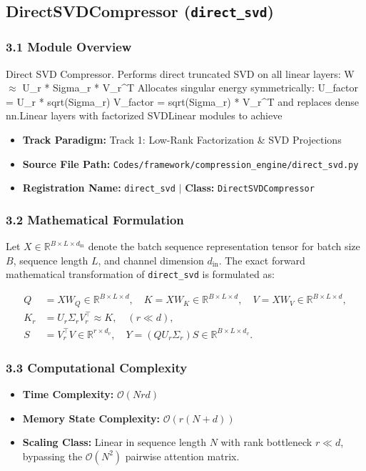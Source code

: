 \subsection{DirectSVDCompressor (\texttt{direct\_svd})}
\label{sec:app_module_direct_svd}

\subsubsection*{3.1 Module Overview}
Direct SVD Compressor.  Performs direct truncated SVD on all linear layers:     W $\approx$ U\_r * Sigma\_r * V\_r^T Allocates singular energy symmetrically:     U\_factor = U\_r * sqrt(Sigma\_r)     V\_factor = sqrt(Sigma\_r) * V\_r^T and replaces dense nn.Linear layers with factorized SVDLinear modules to achieve
\begin{itemize}
    \item \textbf{Track Paradigm:} Track 1: Low-Rank Factorization & SVD Projections
    \item \textbf{Source File Path:} \texttt{Codes/framework/compression\_engine/direct\_svd.py}
    \item \textbf{Registration Name:} \texttt{direct\_svd} $\mid$ \textbf{Class:} \texttt{DirectSVDCompressor}
\end{itemize}

\subsubsection*{3.2 Mathematical Formulation}
Let $X \in \mathbb{R}^{B \times L \times d_{\text{in}}}$ denote the batch sequence representation tensor for batch size $B$, sequence length $L$, and channel dimension $d_{\text{in}}$. The exact forward mathematical transformation of \texttt{direct\_svd} is formulated as:

\begin{align}
Q &= X W_Q \in \mathbb{R}^{B \times L \times d}, \quad K = X W_K \in \mathbb{R}^{B \times L \times d}, \quad V = X W_V \in \mathbb{R}^{B \times L \times d}, \\
K_r &= U_r \Sigma_r V_r^\top \approx K, \quad (r \ll d), \\
S &= V_r^\top V \in \mathbb{R}^{r \times d_v}, \quad Y = (Q U_r \Sigma_r) S \in \mathbb{R}^{B \times L \times d_v}.
\end{align}


\subsubsection*{3.3 Computational Complexity}
\begin{itemize}
    \item \textbf{Time Complexity:} $\mathcal{O}(N r d)$
    \item \textbf{Memory State Complexity:} $\mathcal{O}(r(N + d))$
    \item \textbf{Scaling Class:} Linear in sequence length $N$ with rank bottleneck $r \ll d$, bypassing the $\mathcal{O}(N^2)$ pairwise attention matrix.
\end{itemize}

